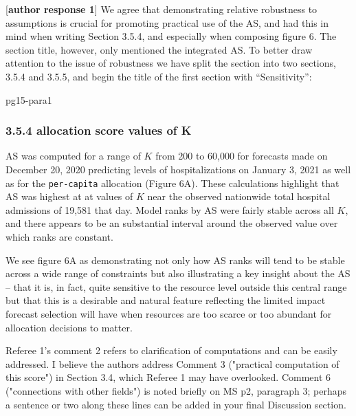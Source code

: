 \documentclass{article}
\begin{document}
[\textbf{author response 1}] We agree that demonstrating relative robustness to assumptions is crucial for promoting practical use of the AS, and had this in mind when writing
Section 3.5.4, and especially when composing figure 6.  The section title, however, only mentioned the integrated AS. To better draw attention to
the issue of robustness we have split the section into two sections, 3.5.4 and 3.5.5,
and begin the title of the first section with ``Sensitivity'':

\begin{mybox}{pg15-para1}
  \subsubsection*{3.5.4 \quad \DIFdelbegin {}\DIFdelend \DIFaddbegin {}\DIFaddend allocation score \DIFdelbegin {}\DIFdelend \DIFaddbegin {}\DIFaddend values of K}
  \DIFdelbegin %
  \DIFdelend \DIFaddbegin \label{sec:sensitivity}
  \DIFaddend 
AS was computed for a range of $K$ from 200 to 60,000 \DIFaddbegin {}\DIFaddend for forecasts made on December 20, 2020 predicting levels of
hospitalizations on January 3, 2021 as well as for the \texttt{per-capita} allocation (Figure 6A). These
calculations highlight that AS was highest at at values of $K$ near the observed nationwide total hospital admissions of
19,581 that day. Model ranks by AS were fairly stable across all $K$, and there appears
to be an substantial interval around the observed value over which ranks are constant.

\end{mybox}

We see figure 6A as demonstrating not only how AS ranks will tend to be stable across a wide range of constraints but 
also illustrating a key insight about the AS -- that it is,
in fact, quite sensitive to the resource level outside this central range but that this is a desirable and
natural feature reflecting the limited impact forecast selection will have when
resources are too scarce or too abundant for allocation decisions to matter.


\begin{quotebar}
Referee 1's comment 2 refers to clarification of computations and
can be easily addressed.  I believe the authors address Comment 3
("practical computation of this score") in Section 3.4, which Referee 1
may have overlooked.  Comment 6 ("connections with other fields") is
noted briefly on MS p2, paragraph 3; perhaps a sentence or two along
these lines can be added in your final Discussion section.
\end{quotebar}
\end{document}
